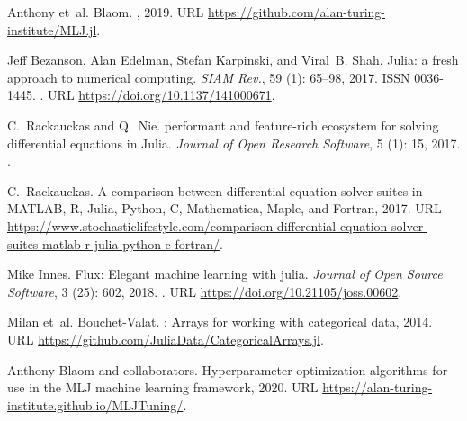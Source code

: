 \documentclass{article}
\begin{document}
\begin{thebibliography}{18}
Anthony et~al. Blaom.
, 2019.
\newblock URL \url{https://github.com/alan-turing-institute/MLJ.jl}.

Jeff Bezanson, Alan Edelman, Stefan Karpinski, and Viral~B. Shah.
\newblock Julia: a fresh approach to numerical computing.
\newblock \emph{SIAM Rev.}, 59 (1): 65--98, 2017.
\newblock ISSN 0036-1445.
\newblock {}.
\newblock URL \url{https://doi.org/10.1137/141000671}.

C.~Rackauckas and Q.~Nie.
 performant and feature-rich
  ecosystem for solving differential equations in {J}ulia.
\newblock \emph{Journal of Open Research Software}, 5 (1):
  15, 2017.
\newblock {}.

C.~Rackauckas.
\newblock A comparison between differential equation solver suites in {MATLAB},
  {R}, {J}ulia, {P}ython, {C}, {M}athematica, {M}aple, and {F}ortran, 2017.
\newblock URL
  \url{https://www.stochasticlifestyle.com/comparison-differential-equation-solver-suites-matlab-r-julia-python-c-fortran/}.

Mike Innes.
\newblock Flux: Elegant machine learning with julia.
\newblock \emph{Journal of Open Source Software}, 3 (25):
  602, 2018.
\newblock {}.
\newblock URL \url{https://doi.org/10.21105/joss.00602}.

Milan et~al. Bouchet-Valat.
: {A}rrays for working with categorical data,
  2014.
\newblock URL \url{https://github.com/JuliaData/CategoricalArrays.jl}.


Anthony Blaom and collaborators.
\newblock Hyperparameter optimization algorithms for use in the {MLJ} machine
  learning framework, 2020.
\newblock URL \url{https://alan-turing-institute.github.io/MLJTuning/}.


\end{thebibliography}
\end{document}
